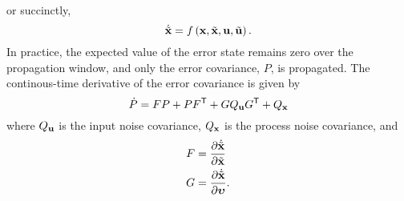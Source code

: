 or succinctly,
\begin{equation}
  \dot{\tilde{\boldsymbol{\mathrm{x}}}} = f\left(\boldsymbol{\mathrm{x}}, \tilde{\boldsymbol{\mathrm{x}}}, \boldsymbol{\mathrm{u}}, \tilde{\boldsymbol{\mathrm{u}}}\right).
\end{equation}
In practice, the expected
value of the error state remains zero over the propagation window, and only the
error covariance, $P$, is propagated.
The continous-time derivative of the error covariance is given by
\begin{equation}
  \dot{P} = FP + PF^{\mathsf{T}} + G Q_{\boldsymbol{\mathrm{u}}} G^{\mathsf{T}} + Q_{\boldsymbol{\mathrm{x}}}
\end{equation}
where $Q_{\boldsymbol{\mathrm{u}}}$ is the input noise covariance, $Q_{\boldsymbol{\mathrm{x}}}$ is the
process noise covariance, and
\begin{align}
  F &= \frac{ \partial \dot{\tilde{\boldsymbol{\mathrm{x}}}} }{ \partial \tilde{\boldsymbol{\mathrm{x}}} } \\
  G &= \frac{ \partial \dot{\tilde{\boldsymbol{\mathrm{x}}}} }{ \partial \boldsymbol{\mathrm{\upsilon}} } .
\end{align}
